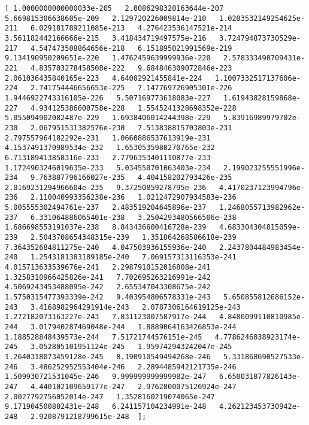 \documentclass[11pt]{article}
\begin{document}
\begin{Verbatim}[commandchars=\\\{\}]
[ 1.0000000000000033e-205   2.0086298320163644e-207   5.669815306638605e-209   2.129720226009814e-210   1.0203532149254625e-211   6.029181789211085e-213   4.276423536147521e-214   3.561182442166666e-215   3.418434719497575e-216   3.724794873730529e-217   4.547473508864656e-218   6.151895021991569e-219   9.134190950209651e-220   1.4762459639999936e-220   2.578333490709431e-221   4.835703278458508e-222   9.684846309072846e-223   2.061036435840165e-223   4.64002921455841e-224   1.1007332517137606e-224   2.741754446656653e-225   7.147769726905301e-226   1.9446922743316105e-226   5.507169773618083e-227   1.61943828159868e-227   4.934125386600758e-228   1.5545241328698352e-228   5.055094902082487e-229   1.6938406014244398e-229   5.83916989979702e-230   2.067951531382576e-230   7.513838815703803e-231   2.797557964182292e-231   1.0660886537613919e-231   4.1537491370989534e-232   1.6530535980270765e-232   6.713189413858316e-233   2.7796353401110877e-233   1.1724903246019635e-233   5.034550701063403e-234   2.199023255551996e-234   9.763887796166027e-235   4.404158202793426e-235   2.0169231294966604e-235   9.37250859278795e-236   4.4170237123994796e-236   2.110040993356238e-236   1.0212472907934583e-236   5.005555302494761e-237   2.483519204645896e-237   1.2468055713982962e-237   6.331064886065401e-238   3.2504293480566506e-238   1.686698553191037e-238   8.843436600416728e-239   4.683304304815059e-239   2.5043708654348315e-239   1.351864268586618e-239   7.364352684811275e-240   4.047503936155936e-240   2.2437804484983454e-240   1.2543181383189185e-240   7.069157313116353e-241   4.015713633539676e-241   2.2987910152016808e-241   1.3258310966425826e-241   7.702695263216991e-242   4.5069243453488095e-242   2.655347043308675e-242   1.5750315477393339e-242   9.403954806578331e-243   5.650855812686152e-243   3.4168982964291914e-243   2.0787306164619125e-243   1.272182073163227e-243   7.831123007587917e-244   4.8480099110810985e-244   3.017940287469048e-244   1.8889064163426853e-244   1.188528848439573e-244   7.51721744576151e-245   4.7786246038923174e-245   3.052805101951124e-245   1.959742943242047e-245   1.2640318073459128e-245   8.190910549494268e-246   5.331868690527533e-246   3.486252952553404e-246   2.2894485942121735e-246   1.509930721531045e-246   9.999999999999982e-247   6.650031077826143e-247   4.440102109659177e-247   2.9762800075126924e-247   2.0027792756052014e-247   1.3528160219074065e-247   9.171904500802431e-248   6.241157104234991e-248   4.262123453730942e-248   2.9208791218799615e-248  ];

\end{Verbatim}
\end{document}
